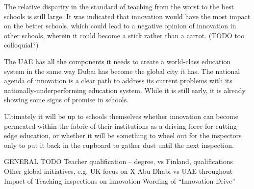 The relative disparity in the standard of teaching from the worst to the best schools is still large. It was indicated that innovation would have the most impact on the better schools, which could lead to a negative opinion of innovation in other schools, wherein it could become a stick rather than a carrot. (TODO too colloquial?)

The UAE has all the components it needs to create a world-class education system in the same way Dubai has become the global city it has. The national agenda of innovation is a clear path to address its current problems with its nationally-underperforming education system. While it is still early, it is already showing some signs of promise in schools. 

Ultimately it will be up to schools themselves whether innovation can become permeated within the fabric of their institutions as a driving force for cutting edge education, or whether it will be something to wheel out for the inspectors only to put it back in the cupboard to gather dust until the next inspection.

GENERAL TODO
Teacher qualification – degree, vs Finland, qualifications
Other global initiatives, e.g. UK focus on X
Abu Dhabi vs UAE throughout
Impact of Teaching inspections on innovation
Wording of “Innovation Drive”

